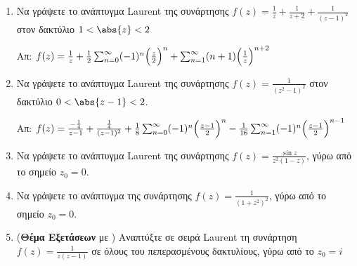 \begin{enumerate}
\item Να γράψετε το ανάπτυγμα \textlatin{Laurent} της συνάρτησης $f(z)=\frac{1}{z}+\frac{1}{z+2}+\frac{1}{(z-1)^2}$ στον δακτύλιο $1<\abs{z}<2$

\hfill Απ: $f(z)=\frac{1}{z}+\frac{1}{2}\sum_{n=0}^{\infty}(-1)^n\Bigl(\frac{z}{2}\Bigr)^n+\sum_{n=1}^{\infty}(n+1)\Bigl(\frac{1}{z}\Bigr)^{n+2}$

\item Να γράψετε το ανάπτυγμα \textlatin{Laurent} της συνάρτησης $f(z)=\frac{1}{(z^2-1)^2}$ στον δακτύλιο $0<\abs{z-1}<2$.

\hfill Απ: $f(z)=\frac{-\frac{1}{4}}{z-1}+\frac{\frac{1}{4}}{(z-1)^2}+\frac{1}{8}\sum_{n=0}^{\infty}(-1)^n\Bigl(\frac{z-1}{2}\Bigr)^n-\frac{1}{16}\sum_{n=1}^{\infty}(-1)^n\Bigl(\frac{z-1}{2}\Bigr)^{n-1}$

\item Να γράψετε το ανάπτυγμα \textlatin{Laurent} της συνάρτησης $f(z)=\frac{\sin z}{z^2(1-z)}$, γύρω από το σημείο $z_0=0$.

\item Να γράψετε το ανάπτυγμα  της συνάρτησης $f(z)=\frac{1}{(1+z^2)^2}$, γύρω από το σημείο $z_0=0$.

\item (\textbf{Θέμα Εξετάσεων} με \unboldmath) Αναπτύξτε σε σειρά \textlatin{Laurent} τη συνάρτηση $f(z)=\frac{1}{z(z-1)}$ σε όλους του πεπερασμένους δακτυλίους, γύρω από το $z_0=i$

\end{enumerate}




